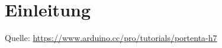 %
%
%

\chapter{Einleitung}

{\tiny Quelle: \url{https://www.arduino.cc/pro/tutorials/portenta-h7}}



